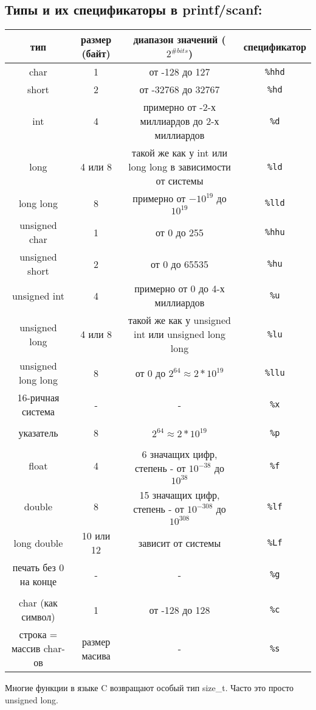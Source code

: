 \documentclass{article}
\begin{document}
\subsection*{Типы и их спецификаторы в printf/scanf:}
\begin{center}
\begin{tabular}{ c c c c }
 тип & размер (байт) & диапазон значений ($2^{\# bits}$) & спецификатор \\ \hline
 char & 1 & от -128 до 127 & \texttt{\%hhd} \\ 
 short & 2 & от -32768 до 32767 & \texttt{\%hd}  \\  
 int & 4 & примерно от -2-х миллиардов до 2-х миллиардов & \texttt{\%d}  \\  
 long & 4 или 8 & такой же как у int или long long в зависимости от системы & \texttt{\%ld}  \\  
 long long & 8 & примерно от $-10^{19}$ до $10^{19}$ & \texttt{\%lld}  \\  
 unsigned char & 1 & от 0 до 255 & \texttt{\%hhu} \\ 
 unsigned short & 2 & от 0 до 65535 & \texttt{\%hu}  \\  
 unsigned int & 4 & примерно от 0 до 4-х миллиардов & \texttt{\%u}  \\  
 unsigned long & 4 или 8 & такой же как у unsigned int или unsigned long long & \texttt{\%lu}  \\  
 unsigned long long & 8 & от 0 до $2^{64} \approx 2*10^{19}$  & \texttt{\%llu}  \\  
 16-ричная система & - & - & \texttt{\%x}  \\   \\
 указатель & 8 & $2^{64} \approx 2*10^{19}$ & \texttt{\%p}  \\   \\
 float & 4 & 6 значащих цифр, степень - от $10^{-38}$ до $10^{38}$ & \texttt{\%f} \\
 double & 8 & 15 значащих цифр, степень - от $10^{-308}$ до $10^{308}$ & \texttt{\%lf} \\
 long double & 10 или 12 & зависит от системы & \texttt{\%Lf} \\ 
 печать без 0 на конце & - & - & \texttt{\%g} \\ \\
 char (как символ) & 1 & от -128 до 128 & \texttt{\%c}\\
 строка = массив char-ов & размер масива & - & \texttt{\%s}\\ \hline
\end{tabular}
\end{center}
Многие функции в языке C возвращают особый тип size\_t. Часто это просто unsigned long.
\end{document}
